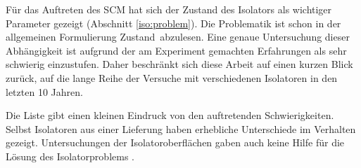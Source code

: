%
%
%
%
\label{iso:liste}
%
Für das Auftreten des SCM hat sich der Zustand des Isolators als
wichtiger Parameter gezeigt (Abschnitt \vref{iso:problem}). Die
Problematik ist schon in der allgemeinen Formulierung \glqq
Zustand\grqq\ abzulesen. Eine genaue Untersuchung dieser Abhängigkeit
ist aufgrund der am Experiment gemachten Erfahrungen als sehr schwierig
einzustufen. Daher beschränkt sich diese Arbeit auf einen kurzen Blick
zurück, auf die lange Reihe der Versuche mit verschiedenen Isolatoren
in den letzten 10 Jahren.
\par
Die Liste gibt einen kleinen Eindruck von den auftretenden
Schwierigkeiten. Selbst Isolatoren aus einer Lieferung haben erhebliche
Unterschiede im Verhalten gezeigt. Untersuchungen der
Isolatoroberflächen gaben auch keine Hilfe für die Lösung des
Isolatorproblems \cite{kies:86}.
%
\newcommand{\fm}[5]{
    (a) \>#1 \>(b) #2 \>(c) #3 hPa\\*
    \>(d) #4\\*
    \>(e) #5\\[0pt plus10pt]
  }
%
